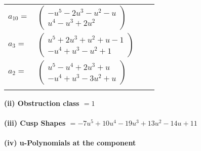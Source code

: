 \documentclass[1p]{elsarticle_modified}
\theoremstyle{definition}
\begin{document}
\begin{tabular}{m{7pt} m{180pt} m{7pt} m{180pt} }
\flushright $a_{10}=$&$\begin{pmatrix}- u^5-2 u^3- u^2- u\\u^4- u^3+2 u^2\end{pmatrix}$ \\
\flushright $a_{3}=$&$\begin{pmatrix}u^5+2 u^3+u^2+u-1\\- u^4+u^3- u^2+1\end{pmatrix}$ \\
\flushright $a_{2}=$&$\begin{pmatrix}u^5- u^4+2 u^3+u\\- u^4+u^3-3 u^2+u\end{pmatrix}$\\&\end{tabular}
\flushleft \textbf{(ii) Obstruction class $= 1$}\\~\\
\flushleft \textbf{(iii) Cusp Shapes $= -7 u^5+10 u^4-19 u^3+13 u^2-14 u+11$}\\~\\
\newpage\renewcommand{\arraystretch}{1}
\flushleft \textbf{(iv) u-Polynomials at the component}\newline \\
\end{document}
